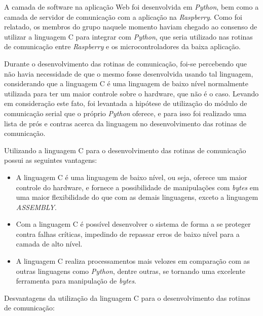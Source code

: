 A camada de software na aplicação Web foi desenvolvida em \textit{Python}, bem como a camada de servidor de comunicação com a aplicação na 
\textit{Raspberry}. Como foi relatado, os membros do grupo naquele momento haviam chegado ao consenso de utilizar a linguagem C para integrar 
com \textit{Python}, que seria utilizado nas rotinas de comunicação entre \textit{Raspberry} e os microcontroladores da baixa aplicação.

Durante o desenvolvimento das rotinas de comunicação, foi-se percebendo que não havia necessidade de que o mesmo fosse desenvolvida 
usando tal linguagem, considerando que a linguagem C é uma linguagem de baixo nível normalmente utilizada para ter um maior controle sobre o 
hardware, que não é o caso. Levando em consideração este fato, foi levantada a hipótese de utilização do módulo de comunicação serial que o próprio 
\textit{Python} oferece, e para isso foi realizado uma lista de prós e contras acerca da linguagem no desenvolvimento das rotinas de comunicação.

Utilizando a linguagem C para o desenvolvimento das rotinas de comunicação possui as seguintes vantagens:

\begin{itemize}
    \item A linguagem C é uma linguagem de baixo nível, ou seja, oferece um maior controle do hardware, e fornece a possibilidade de manipulações com \textit{bytes} em uma maior flexibilidade do que com as demais linguagens, exceto a linguagem \textit{ASSEMBLY}.
    \item Com a linguagem C é possível desenvolver o sistema de forma a se proteger contra falhas críticas, impedindo de repassar erros de baixo nível para a camada de alto nível.
    \item A linguagem C realiza processamentos mais velozes em comparação com as outras linguagens como \textit{Python}, dentre outras, se tornando uma excelente ferramenta para manipulação de \textit{bytes}.
\end{itemize}

Desvantagens da utilização da linguagem C para o desenvolvimento das rotinas de comunicação:

